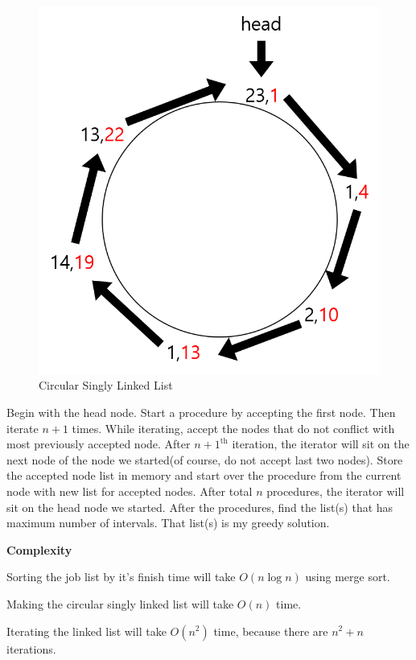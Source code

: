 \documentclass[a4paper,11pt]{article}
\begin{document}
\begin{enumerate}
\begin{figure}[hbt]
	\centering
	\includegraphics[scale=0.4]{figure3.png}
	\caption{Circular Singly Linked List}
\end{figure}

Begin with the head node. Start a procedure by accepting the first node. 
Then iterate $n+1$ times. 
While iterating, accept the nodes that do not conflict with most previously accepted node.
After ${n+1}^{\text{th}}$ iteration, the iterator will sit on the next node of the node we started(of course, do not accept last two nodes).
Store the accepted node list in memory and start over the procedure from the current node with new list for accepted nodes. 
After total $n$ procedures, the iterator will sit on the head node we started.
After the procedures, find the list(s) that has maximum number of intervals.
That list(s) is my greedy solution.

{\bf Complexity}

Sorting the job list by it's finish time will take $O(n\log{}n)$ using merge sort.

Making the circular singly linked list will take $O(n)$ time.

Iterating the linked list will take $O(n^2)$ time, because there are $n^2+n$ iterations.


\end{enumerate}
\end{document}

